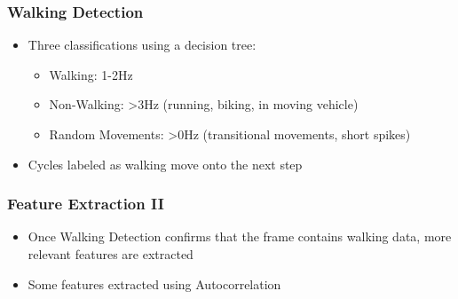 \documentclass{beamer}
\begin{document}
\begin{frame}
\frametitle{Walking Detection}
	\begin{itemize}
		\item Three classifications using a decision tree:
			\begin{itemize}
				\item Walking: 1-2Hz
				\linebreak
				\item Non-Walking: >3Hz (running, biking, in moving vehicle)
				\linebreak
				\item Random Movements: >0Hz (transitional movements, short spikes)
				\linebreak
			\end{itemize}
			
		\item Cycles labeled as walking move onto the next step
	\end{itemize}
\end{frame}

\begin{frame}
\frametitle{Feature Extraction II}
	\begin{itemize}
		\item Once Walking Detection confirms that the frame contains walking data, more relevant features are extracted
		\linebreak
		
		\item Some features extracted using Autocorrelation
		
		
%		



	\end{itemize}
\end{frame}

\end{document}
